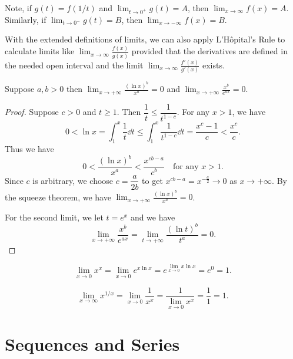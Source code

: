 \documentclass[a4paper]{ctexart}
\begin{document}
        \begin{myrmk}
            Note, if $g(t) = f(1/t)$ and $\displaystyle \lim_{t\to 0^+} g(t) = A$, then $\displaystyle \lim_{x\to \infty} f(x) = A$. Similarly, if $\displaystyle \lim_{t\to 0^-} g(t) = B$, then $\displaystyle \lim_{x\to -\infty} f(x) = B$.
        \end{myrmk}
        \begin{myrmk}
            With the extended definitions of limits, we can also apply L'Hôpital's Rule to calculate limits like $\displaystyle \lim_{x\to \infty} \frac{f(x)}{g(x)}$ provided that the derivatives are defined in the needed open interval and the limit $\displaystyle \lim_{x\to \infty} \frac{f'(x)}{g'(x)}$ exists.
        \end{myrmk}
        \begin{mythm}
            Suppose $a,b>0$ then $\displaystyle \lim_{x\to +\infty} \frac{(\ln x)^b}{x^a} = 0$ and $\displaystyle \lim_{x\to +\infty} \frac{x^b}{e^{ax}} = 0$.
        \end{mythm}
        \begin{proof}
            Suppose $c>0$ and $t\ge 1$. Then $\dfrac{1}{t} \le \dfrac{1}{t^{1-c}}$. For any $x>1$, we have
            \[
            0<\ln x = \int_1^x \frac{1}{t} \dd t \le \int_1^x \frac{1}{t^{1-c}} \dd t = \frac{x^c - 1}{c} < \frac{x^c}{c}.
            \]
            Thus we have
            \[
            0 < \frac{(\ln x)^b}{x^a} < \frac{x^{cb-a}}{c^b} \quad \text{for any } x>1.
            \]
            Since $c$ is arbitrary, we choose $c=\dfrac{a}{2b}$ to get $x^{cb-a} = x^{-\frac{a}{2}} \to 0$ as $x\to +\infty$. By the squeeze theorem, we have $\displaystyle \lim_{x\to +\infty} \frac{(\ln x)^b}{x^a} = 0$.

            For the second limit, we let $t=e^x$ and we have
            \[
            \lim_{x\to +\infty} \frac{x^b}{e^{ax}} = \lim_{t\to +\infty} \frac{(\ln t)^b}{t^a} = 0.
            \]
        \end{proof}
    \begin{myex}
        \[
        \lim_{x\to 0} x^x = \lim_{x\to 0} e^{x\ln x} = e^{\lim_{x\to 0} x\ln x} = e^0 = 1.
        \]
    \end{myex}
    \begin{myex}
        \[
        \lim_{x\to \infty} x^{1/x} = \lim_{x\to 0} \frac{1}{x^x} = \frac{1}{\displaystyle \lim_{x\to 0} x^x} = \frac{1}{1} = 1.
        \]
    \end{myex}
    \newpage
    \section{Sequences and Series}
\end{document}
